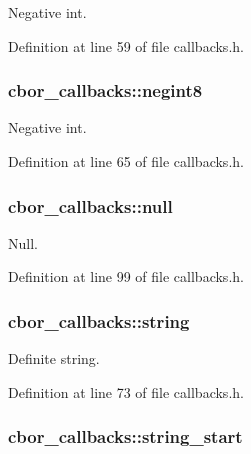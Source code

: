 Negative int. 



Definition at line 59 of file callbacks.\-h.

\hypertarget{structcbor__callbacks_aae703108db340c2df1af0154b23b9631}{
\subsubsection[{negint8}]{ cbor\-\_\-callbacks\-::negint8}}\label{structcbor__callbacks_aae703108db340c2df1af0154b23b9631}


Negative int. 



Definition at line 65 of file callbacks.\-h.

\hypertarget{structcbor__callbacks_a7483f952b13db66abd893082a204859d}{
\subsubsection[{null}]{ cbor\-\_\-callbacks\-::null}}\label{structcbor__callbacks_a7483f952b13db66abd893082a204859d}


Null. 



Definition at line 99 of file callbacks.\-h.

\hypertarget{structcbor__callbacks_a18144e8cc29b3562f071188c3d9086eb}{
\subsubsection[{string}]{ cbor\-\_\-callbacks\-::string}}\label{structcbor__callbacks_a18144e8cc29b3562f071188c3d9086eb}


Definite string. 



Definition at line 73 of file callbacks.\-h.

\hypertarget{structcbor__callbacks_ac5a3ff3cd57f469460c13598d14eb2eb}{
\subsubsection[{string\-\_\-start}]{ cbor\-\_\-callbacks\-::string\-\_\-start}}\label{structcbor__callbacks_ac5a3ff3cd57f469460c13598d14eb2eb}


